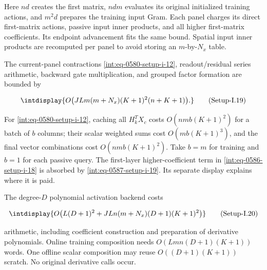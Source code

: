 
Here \(nd\) creates the first matrix, \(ndm\) evaluates its original initialized training actions, and \(m^2d\) prepares the training input Gram. Each panel charges its direct first-matrix actions, passive input inner products, and all higher first-matrix coefficients. Its endpoint advancement fits the same bound. Spatial input inner products are recomputed per panel to avoid storing an \(m\)-by-\(N_x\) table.



The current-panel contractions \hyperref[int:eq-setup-i-12]{\eqref{int:eq-0580-setup-i-12}}, readout/residual series arithmetic, backward gate multiplication, and grouped factor formation are bounded by


\label{int:eq-setup-i-19}
\begingroup\renewcommand{\theHequation}{intdisplay.1102}
\begin{equation}
\intdisplay{
O\bigl(JL m(m+N_x)(K+1)^2(n+K+1)\bigr).
}
\tag{Setup-I.19}
\label{int:eq-0587-setup-i-19}
\end{equation}
\endgroup


For \hyperref[int:eq-setup-i-12]{\eqref{int:eq-0580-setup-i-12}}, caching all \(H_k^TX_c\) costs \(O(nmb(K+1)^2)\) for a batch of \(b\) columns; their scalar weighted sums cost \(O(mb(K+1)^3)\), and the final vector combinations cost \(O(nmb(K+1)^2)\). Take \(b=m\) for training and \(b=1\) for each passive query. The first-layer higher-coefficient term in \hyperref[int:eq-setup-i-18]{\eqref{int:eq-0586-setup-i-18}} is absorbed by \hyperref[int:eq-setup-i-19]{\eqref{int:eq-0587-setup-i-19}}. Its separate display explains where it is paid.



The degree-\(D\) polynomial activation backend costs


\label{int:eq-setup-i-20}
\begingroup\renewcommand{\theHequation}{intdisplay.1103}
\begin{equation}
\intdisplay{
O\bigl(L(D+1)^2+JLn(m+N_x)(D+1)(K+1)^2\bigr)
}
\tag{Setup-I.20}
\label{int:eq-0588-setup-i-20}
\end{equation}
\endgroup


arithmetic, including coefficient construction and preparation of derivative polynomials. Online training composition needs \(O(Lmn(D+1)(K+1))\) words. One offline scalar composition may reuse \(O((D+1)(K+1))\) scratch. No original derivative calls occur.


